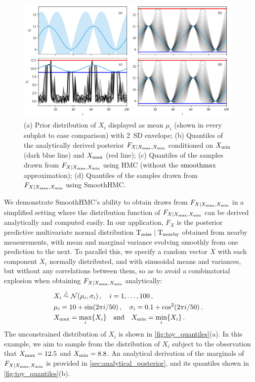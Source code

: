 \documentclass[12pt]{article}
\begin{document}
\begin{figure}[!tb]
\centering
\includegraphics[width=0.99\textwidth,height=0.55\textheight,keepaspectratio]{../figures/toy_quantiles.png}
\caption{\label{fig:toy_quantiles}(a) Prior distribution of \(X_i\) displayed as mean \(\mu_i\) (shown in every subplot to ease comparison) with 2~SD envelope; (b) Quantiles of the analytically derived posterior \(F_{X \mid X_{\max},X_{\min}}\) conditioned on \(X_{\min}\) (dark blue line) and \(X_{\max}\) (red line); (c) Quantiles of the samples drawn from \(F_{X \mid X_{\max},X_{\min}}\) using HMC (without the \(\operatorname*{smoothmax}\) approximation); (d) Quantiles of the samples drawn from \(F_{X \mid X_{\max},X_{\min}}\) using SmoothHMC.}
\end{figure}

We demonstrate SmoothHMC's ability to obtain draws from \(F_{X \mid X_{\max},X_{\min}}\) in a simplified setting where the distribution function of \(F_{X \mid X_{\max},X_{\min}}\) can be derived analytically and computed easily.
In our application, \(F_X\) is the posterior predictive multivariate normal distribution \(\mathrm{T}_{\mathrm{miss}} \mid \mathrm{T}_{\mathrm{nearby}}\) obtained from nearby measurements, with mean and marginal variance evolving smoothly from one prediction to the next.
To parallel this, we specify a random vector \(X\) with each component \(X_i\) normally distributed, and with sinusoidal means and variances, but without any correlations between them,
so as to avoid a combinatorial explosion when obtaining \(F_{X \mid X_{\max},X_{\min}}\) analytically:
\begin{equation}
\begin{split}
& X_i \overset{\indep}{\sim} \normal \del{\mu_i, \sigma_i} \,,\quad i = 1, \dotsc, 100 \,, \\
& \mu_i = 10 + \sin\del{2\pi i / 50} \,,\quad \sigma_i = 0.1+\cos^2\del{2\pi i / 50} \,.\\
& \Xmax = \max_i\cbr{X_i} \quad\text{and}\quad \Xmin = \min_i\cbr{X_i} 
\,.
\end{split}
\label{eq:toyspec}
\end{equation}
The unconstrained distribution of \(X_i\) is shown in \autoref{fig:toy_quantiles}(a).
In this example, we aim to sample from the distribution of \(X_i\) subject to the observation that \(X_{\max}=12.5\) and \(X_{\min}=8.8\).
An analytical derivation of the marginals of \(F_{X \mid X_{\max},X_{\min}}\) is provided in \autoref{sec:analytical_posterior}, and its quantiles shown in \autoref{fig:toy_quantiles}(b).
\end{document}
